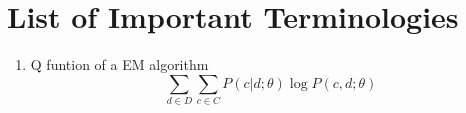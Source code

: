\documentclass[11pt]{article}
\begin{document}
\section{List of Important Terminologies}
\begin{enumerate}
 \item Q funtion of a EM algorithm $$\sum_{d \in D} \sum_{c \in C} P(c|d; \theta) \log P(c, d; \theta)$$
\end{enumerate}



\end{document}
